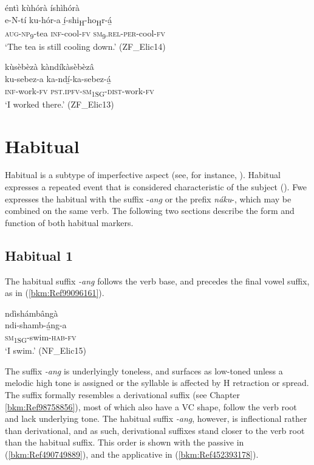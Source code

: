 \ea
\label{bkm:Ref452976658}
éntì kùhórà íshìhórà\\
\gll e-N-tí  ku-hór-a  í̲-shi\textsubscript{H}-ho\textsubscript{H}r-á̲\\
\textsc{aug}-\textsc{np}\textsubscript{9}-tea  \textsc{inf}-cool-\textsc{fv}  \textsc{sm}\textsubscript{9}.\textsc{rel}-\textsc{per}-cool-\textsc{fv}\\
\glt ‘The tea is still cooling down.’ (ZF\_Elic14)
\z

\ea
\label{bkm:Ref452976659}
kùsèbèzà kàndíkàsèbèzâ\\
\gll ku-sebez-a  ka-ndí̲-ka-sebez-á̲\\
\textsc{inf}-work-\textsc{fv}  \textsc{pst}.\textsc{ipfv}-\textsc{sm}\textsubscript{1SG}-\textsc{dist}-work-\textsc{fv}\\
\glt ‘I worked there.’ (ZF\_Elic13)
\z
\section{Habitual}
\hypertarget{Toc75352693}{}
Habitual is a subtype of imperfective aspect (see, for instance, {\citet[25]{Comrie1976}}). Habitual expresses a repeated event that is considered characteristic of the subject (\citealt{BertinettoLenci2012}). Fwe expresses the habitual with the suffix -\textit{ang} or the prefix \textit{náku}-, which may be combined on the same verb. The following two sections describe the form and function of both habitual markers.

\subsection{Habitual 1}
\label{bkm:Ref451268511}\hypertarget{Toc75352694}{}\label{bkm:Ref70945764}
The habitual suffix \textit{-ang} follows the verb base, and precedes the final vowel suffix, as in (\ref{bkm:Ref99096161}).

\ea
\label{bkm:Ref99096161}
\glll ndìshámbângà\\
ndi-shamb-á̲ng-a\\
\textsc{sm}\textsubscript{1SG}-swim-\textsc{hab}-\textsc{fv}\\
\glt ‘I swim.’ (NF\_Elic15)
\z

The suffix \textit{-ang} is underlyingly toneless, and surfaces as low-toned unless a melodic high tone is assigned or the syllable is affected by H retraction or spread. The suffix formally resembles a derivational suffix (see Chapter \ref{bkm:Ref98758856}), most of which also have a VC shape, follow the verb root and lack underlying tone. The habitual suffix \textit{-ang}, however, is inflectional rather than derivational, and as such, derivational suffixes stand closer to the verb root than the habitual suffix. This order is shown with the passive in (\ref{bkm:Ref490749889}), and the applicative in (\ref{bkm:Ref452393178}).

